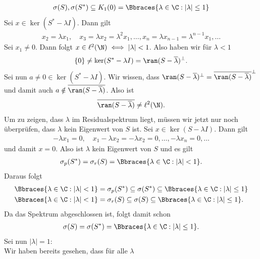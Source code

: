 \begin{solution}
\begin{enumerate}[label = (\alph*)]
  \begin{align*}
    \sigma(S), \sigma(S^*) \subseteq K_{1}(0) = \Bbraces{\lambda \in \C: |\lambda| \leq 1}
  \end{align*}
  Sei $x \in \ker(S^* - \lambda I)$. Dann gilt
  \begin{align*}
    x_2 = \lambda x_1, \quad x_3 = \lambda x_2 = \lambda^2 x_1, \dots, x_n = \lambda x_{n-1} = \lambda^{n-1} x_1, \dots
  \end{align*}
  Sei $x_1 \neq 0$. Dann folgt $x \in \ell^2(\N) \iff |\lambda| < 1$.
  Also haben wir für $\lambda < 1$
  \begin{align*}
    \{0\} \neq \ker(S^* - \lambda I) = \ran(S - \overline{\lambda})^{\bot}.
  \end{align*}
  Sei nun $a \neq 0 \in \ker(S^* - \lambda I)$.
  Wir wissen, dass $\ran(S - \overline{\lambda})^{\bot} = \overline{\ran(S - \overline{\lambda})}^{\bot}$
  und damit auch $a \notin \overline{\ran(S - \overline{\lambda})}$. Also ist
  \begin{align*}
     \overline{\ran(S - \overline{\lambda})} \neq \ell^2(\N).
  \end{align*}
  Um zu zeigen, dass $\lambda$ im Residualspektrum liegt, müssen wir jetzt nur noch
  überprüfen, dass $\lambda$ kein Eigenwert von $S$ ist.
  Sei $x \in \ker(S - \lambda I)$. Dann gilt
  \begin{align*}
    -\lambda x_1 = 0, \quad x_1 - \lambda x_2 = -\lambda x_2 = 0, \dots, -\lambda x_n = 0, \dots
  \end{align*}
  und damit $x = 0$. Also ist $\lambda$ kein Eigenwert von $S$ und es gilt
  \begin{align*}
    \sigma_p(S^\ast) = \sigma_r(S) = \Bbraces{\lambda \in \C: |\lambda| < 1}.
  \end{align*}
  Daraus folgt
  \begin{align*}
    \Bbraces{\lambda \in \C: |\lambda| < 1} &= \sigma_p(S^\ast) \subseteq \sigma(S^*) \subseteq \Bbraces{\lambda \in \C: |\lambda| \leq 1} \\
    \Bbraces{\lambda \in \C: |\lambda| < 1} &= \sigma_r(S) \subseteq \sigma(S) \subseteq \Bbraces{\lambda \in \C: |\lambda| \leq 1}.
  \end{align*}
  Da das Spektrum abgeschlossen ist, folgt damit schon
  \begin{align*}
    \sigma(S) = \sigma(S^*) = \Bbraces{\lambda \in \C: |\lambda| \leq 1}.
  \end{align*}
  Sei nun $|\lambda| = 1$: \\
  Wir haben bereits gesehen, dass für alle $\lambda$

\end{enumerate}
\end{solution}
